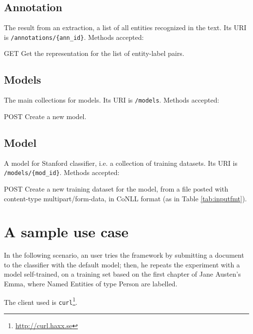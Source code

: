 \documentclass[a4paper,11pt]{report}
\begin{document}
\subsection*{Annotation}
The result from an extraction, a list of all entities recognized in the text. Its URI is \texttt{/annotations/\{ann\_id\}}. Methods accepted:
\begin{description}
\item{GET} Get the representation for the list of entity-label pairs.
\end{description}

\subsection*{Models}
The main collections for models. Its URI is \texttt{/models}. Methods accepted:
\begin{description}
\item{POST} Create a new model.
\end{description}

\subsection*{Model}
A model for Stanford classifier, i.e. a collection of training datasets. Its URI is \texttt{/models/\{mod\_id\}}. Methods accepted:
\begin{description}
\item{POST} Create a new training dataset for the model, from a file posted with content-type multipart/form-data, in CoNLL format (as in Table \ref{tab:inputfmt}). 
\end{description}


\section{A sample use case}
In the following scenario, an user tries the framework by submitting a document to the classifier with the default model; then, he repeats the experiment with a model self-trained, on a training set based on the first chapter of Jane Austen's Emma, where Named Entities of type Person are labelled.

The client used is \texttt{curl}\footnote{\url{http://curl.haxx.se}}.

\cleardoublepage
{}

\nocite{*}
\end{document}
